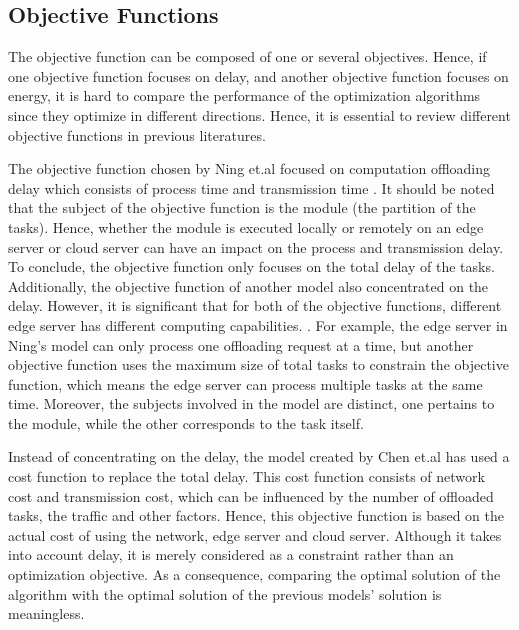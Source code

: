\documentclass[a4paper,11pt]{article}
\begin{document}
\subsection{Objective Functions}
The objective function can be composed of one or several objectives. Hence, if one objective function focuses on delay, and another objective function focuses on energy, it is hard to compare the performance of the optimization algorithms since they optimize in different directions. Hence, it is essential to review different objective functions in previous literatures.\newline

The objective function chosen by Ning et.al focused on computation offloading delay which consists of process time and transmission time \cite{A_Cooperative_Partial_Computation_Offloading_Scheme_for_Mobile_Edge}. It should be noted that the subject of the objective function is the module (the partition of the tasks). Hence, whether the module is executed locally or remotely on an edge server or cloud server can have an impact on the process and transmission delay. To conclude, the objective function only focuses on the total delay of the tasks. Additionally, the objective function of another model also concentrated on the delay. However, it is significant that for both of the objective functions, different edge server has different computing capabilities.  \cite{no_cloud_1_density}. For example, the edge server in Ning's model can only process one offloading request at a time, but another objective function uses the maximum size of total tasks to constrain the objective function, which means the edge server can process multiple tasks at the same time. Moreover, the subjects involved in the model are distinct, one pertains to the module, while the other corresponds to the task itself. \newline

Instead of concentrating on the delay, the model created by Chen et.al \cite{full_offload_2} has used a cost function to replace the total delay. This cost function consists of network cost and transmission cost, which can be influenced by the number of offloaded tasks, the traffic and other factors. Hence, this objective function is based on the actual cost of using the network, edge server and cloud server. Although it takes into account delay, it is merely considered as a constraint rather than an optimization objective. As a consequence, comparing the optimal solution of the algorithm with the optimal solution of the previous models' solution is meaningless.\newline
\end{document}
